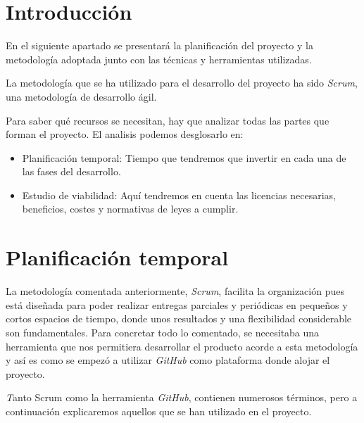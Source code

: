 
\section{Introducción}

En el siguiente apartado se presentará la planificación del proyecto y la metodología adoptada junto con las técnicas y herramientas utilizadas.

La metodología que se ha utilizado para el desarrollo del proyecto ha sido \textit{Scrum}, una metodología de desarrollo ágil.

Para saber qué recursos se necesitan, hay que analizar todas las partes que forman el proyecto. El analisis podemos desglosarlo en:

\begin{itemize}
	\item Planificación temporal: Tiempo que tendremos que invertir en cada una de las fases del desarrollo.
	\item Estudio de viabilidad: Aquí tendremos en cuenta las licencias necesarias, beneficios, costes y normativas de leyes a cumplir.
\end{itemize}


\section{Planificación temporal}

La metodología comentada anteriormente, \textit{Scrum}, facilita la organización pues está diseñada para poder realizar entregas parciales y periódicas en pequeños y cortos espacios de tiempo, donde unos resultados y una flexibilidad considerable son fundamentales. Para concretar todo lo comentado, se necesitaba una herramienta que nos permitiera desarrollar el producto acorde a esta metodología y así es como se empezó a utilizar \textit{GitHub} como plataforma donde alojar el proyecto. 

\textit Tanto {Scrum} como la herramienta \textit{GitHub}, contienen numerosos términos, pero a continuación explicaremos aquellos que se han utilizado en el proyecto.

